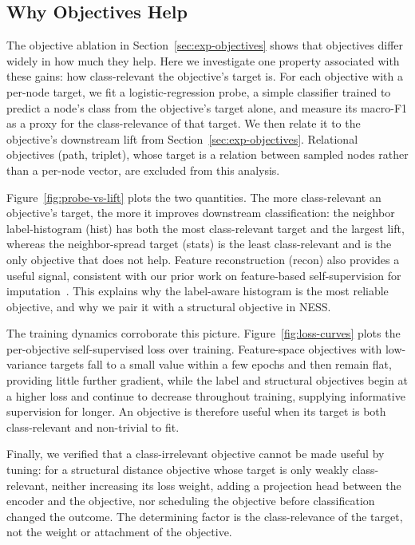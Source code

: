 \subsection{Why Objectives Help}
\label{sec:exp-why}

The objective ablation in Section~\ref{sec:exp-objectives} shows that objectives differ widely in how much they help. Here we investigate one property associated with these gains: how class-relevant the objective's target is. For each objective with a per-node target, we fit a logistic-regression probe, a simple classifier trained to predict a node's class from the objective's target alone, and measure its macro-F1 as a proxy for the class-relevance of that target. We then relate it to the objective's downstream lift from Section~\ref{sec:exp-objectives}. Relational objectives (path, triplet), whose target is a relation between sampled nodes rather than a per-node vector, are excluded from this analysis.

Figure~\ref{fig:probe-vs-lift} plots the two quantities. The more class-relevant an objective's target, the more it improves downstream classification: the neighbor label-histogram (hist) has both the most class-relevant target and the largest lift, whereas the neighbor-spread target (stats) is the least class-relevant and is the only objective that does not help. Feature reconstruction (recon) also provides a useful signal, consistent with our prior work on feature-based self-supervision for imputation~\cite{moshiri2026neighborhood}. This explains why the label-aware histogram is the most reliable objective, and why we pair it with a structural objective in NESS.

The training dynamics corroborate this picture. Figure~\ref{fig:loss-curves} plots the per-objective self-supervised loss over training. Feature-space objectives with low-variance targets fall to a small value within a few epochs and then remain flat, providing little further gradient, while the label and structural objectives begin at a higher loss and continue to decrease throughout training, supplying informative supervision for longer. An objective is therefore useful when its target is both class-relevant and non-trivial to fit.

Finally, we verified that a class-irrelevant objective cannot be made useful by tuning: for a structural distance objective whose target is only weakly class-relevant, neither increasing its loss weight, adding a projection head between the encoder and the objective, nor scheduling the objective before classification changed the outcome. The determining factor is the class-relevance of the target, not the weight or attachment of the objective.

